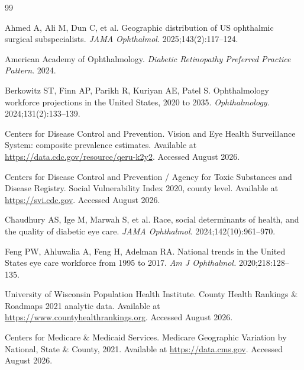 \documentclass[11pt]{article}
\begin{document}
\clearpage


\begin{thebibliography}{99}

Ahmed A, Ali M, Dun C, et al. Geographic distribution of US ophthalmic surgical
subspecialists. \emph{JAMA Ophthalmol.} 2025;143(2):117--124.

American Academy of Ophthalmology. \emph{Diabetic Retinopathy Preferred Practice
Pattern}. 2024.

Berkowitz ST, Finn AP, Parikh R, Kuriyan AE, Patel S. Ophthalmology workforce
projections in the United States, 2020 to 2035. \emph{Ophthalmology.}
2024;131(2):133--139.

Centers for Disease Control and Prevention. Vision and Eye Health Surveillance
System: composite prevalence estimates. Available at
\url{https://data.cdc.gov/resource/qeru-k2y2}. Accessed August 2026.

Centers for Disease Control and Prevention / Agency for Toxic Substances and
Disease Registry. Social Vulnerability Index 2020, county level. Available at
\url{https://svi.cdc.gov}. Accessed August 2026.

Chaudhury AS, Ige M, Marwah S, et al. Race, social determinants of health, and
the quality of diabetic eye care. \emph{JAMA Ophthalmol.}
2024;142(10):961--970.

Feng PW, Ahluwalia A, Feng H, Adelman RA. National trends in the United States
eye care workforce from 1995 to 2017. \emph{Am J Ophthalmol.}
2020;218:128--135.

University of Wisconsin Population Health Institute. County Health Rankings \&
Roadmaps 2021 analytic data. Available at
\url{https://www.countyhealthrankings.org}. Accessed August 2026.

Centers for Medicare \& Medicaid Services. Medicare Geographic Variation by
National, State \& County, 2021. Available at \url{https://data.cms.gov}.
Accessed August 2026.


\end{thebibliography}
\end{document}
